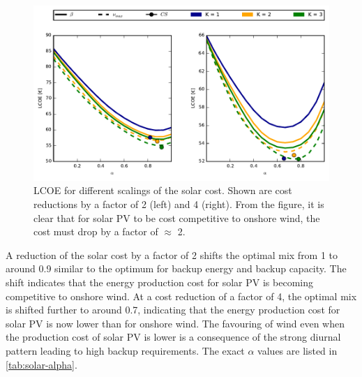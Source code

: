 \documentclass[a4paper, 5p, sort&compress]{elsarticle}%
\begin{document}
\begin{figure}[p]
  \centering
  \includegraphics[width = 2\columnwidth]{solarAnalysis}
  \caption{LCOE for different scalings of the solar cost. Shown are
    cost reductions by a factor of 2 (left) and 4 (right). From the
    figure, it is clear that for solar PV to be cost competitive to
    onshore wind, the cost must drop by a factor of
    $\approx$ 2.}
  \label{fig:red-solar}
\end{figure}

A reduction of the solar cost by a factor of 2 shifts the optimal mix
from 1 to around 0.9 similar to the optimum for backup energy and
backup capacity. The shift indicates that the energy production cost
for solar PV is becoming competitive to onshore wind. At a cost
reduction of a factor of 4, the optimal mix is shifted further to
around 0.7, indicating that the energy production cost for solar PV is
now lower than for onshore wind. The favouring of wind even when the
production cost of solar PV is lower is a consequence of the strong
diurnal pattern leading to high backup requirements. The exact
$\alpha$ values are listed in \cref{tab:solar-alpha}.
\end{document}
